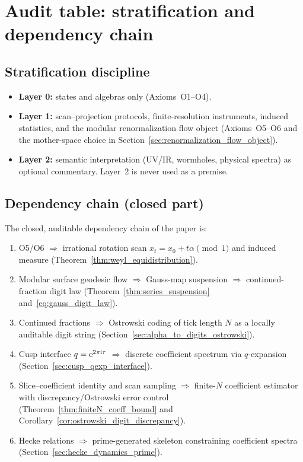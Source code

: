 
\section{Audit table: stratification and dependency chain}
\label{app:audit_dependency_chain}

\subsection{Stratification discipline}

\begin{itemize}
\item \textbf{Layer 0:} states and algebras only (Axioms~O1--O4).
\item \textbf{Layer 1:} scan--projection protocols, finite-resolution instruments, induced statistics, and the modular renormalization flow object (Axioms~O5--O6 and the mother-space choice in Section~\ref{sec:renormalization_flow_object}).
\item \textbf{Layer 2:} semantic interpretation (UV/IR, wormholes, physical spectra) as optional commentary. Layer~2 is never used as a premise.
\end{itemize}

\subsection{Dependency chain (closed part)}

The closed, auditable dependency chain of the paper is:
\begin{enumerate}
\item O5/O6 $\Rightarrow$ irrational rotation scan $x_t=x_0+t\alpha\pmod 1$ and induced measure (Theorem~\ref{thm:weyl_equidistribution}).
\item Modular surface geodesic flow $\Rightarrow$ Gauss-map suspension $\Rightarrow$ continued-fraction digit law (Theorem~\ref{thm:series_suspension} and~\eqref{eq:gauss_digit_law}).
\item Continued fractions $\Rightarrow$ Ostrowski coding of tick length $N$ as a locally auditable digit string (Section~\ref{sec:alpha_to_digits_ostrowski}).
\item Cusp interface $q=\mathrm{e}^{2\pi\mathrm{i}\tau}$ $\Rightarrow$ discrete coefficient spectrum via $q$-expansion (Section~\ref{sec:cusp_qexp_interface}).
\item Slice--coefficient identity and scan sampling $\Rightarrow$ finite-$N$ coefficient estimator with discrepancy/Ostrowski error control (Theorem~\ref{thm:finiteN_coeff_bound} and Corollary~\ref{cor:ostrowski_digit_discrepancy}).
\item Hecke relations $\Rightarrow$ prime-generated skeleton constraining coefficient spectra (Section~\ref{sec:hecke_dynamics_prime}).
\end{enumerate}

